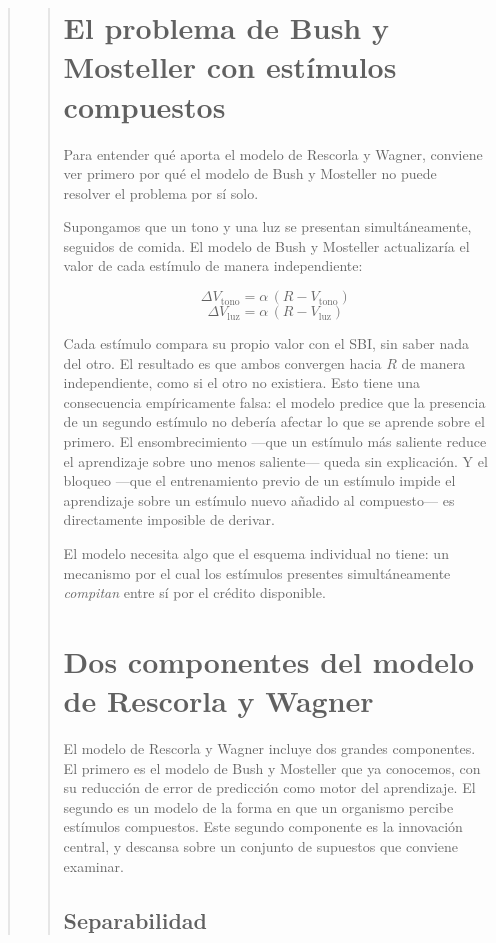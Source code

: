 \documentclass[
  letterpaper,
  DIV=11,
  numbers=noendperiod]{scrreprt}
\begin{document}
\begin{tcolorbox}[enhanced jigsaw, arc=.35mm, bottomrule=.15mm, breakable, colback=white, colframe=quarto-callout-note-color-frame, left=2mm, leftrule=.75mm, opacityback=0, rightrule=.15mm, toprule=.15mm]
\begin{quote}
\begin{quote}
\mbox{}%
\section{El problema de Bush y Mosteller con estímulos
compuestos}\label{el-problema-de-bush-y-mosteller-con-estuxedmulos-compuestos}

Para entender qué aporta el modelo de Rescorla y Wagner, conviene ver
primero por qué el modelo de Bush y Mosteller no puede resolver el
problema por sí solo.

Supongamos que un tono y una luz se presentan simultáneamente, seguidos
de comida. El modelo de Bush y Mosteller actualizaría el valor de cada
estímulo de manera independiente:

\[\Delta V_{\text{tono}} = \alpha\,(R - V_{\text{tono}})\]
\[\Delta V_{\text{luz}} = \alpha\,(R - V_{\text{luz}})\]

Cada estímulo compara su propio valor con el SBI, sin saber nada del
otro. El resultado es que ambos convergen hacia \(R\) de manera
independiente, como si el otro no existiera. Esto tiene una consecuencia
empíricamente falsa: el modelo predice que la presencia de un segundo
estímulo no debería afectar lo que se aprende sobre el primero. El
ensombrecimiento ---que un estímulo más saliente reduce el aprendizaje
sobre uno menos saliente--- queda sin explicación. Y el bloqueo ---que
el entrenamiento previo de un estímulo impide el aprendizaje sobre un
estímulo nuevo añadido al compuesto--- es directamente imposible de
derivar.

El modelo necesita algo que el esquema individual no tiene: un mecanismo
por el cual los estímulos presentes simultáneamente \emph{compitan}
entre sí por el crédito disponible.

\mbox{}%
\section{Dos componentes del modelo de Rescorla y
Wagner}\label{dos-componentes-del-modelo-de-rescorla-y-wagner}

El modelo de Rescorla y Wagner incluye dos grandes componentes. El
primero es el modelo de Bush y Mosteller que ya conocemos, con su
reducción de error de predicción como motor del aprendizaje. El segundo
es un modelo de la forma en que un organismo percibe estímulos
compuestos. Este segundo componente es la innovación central, y descansa
sobre un conjunto de supuestos que conviene examinar.

\mbox{}%
\subsection{Separabilidad}\label{separabilidad}


\end{quote}
\end{quote}
\end{tcolorbox}
\end{document}
